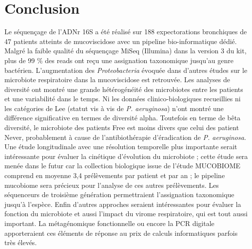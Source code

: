 \documentclass[12pt,a4paper]{article}
\begin{document}
{{\section{Conclusion}
Le séquençage de l'ADNr 16S a été réalisé sur 188 expectorations bronchiques de 47 patients atteints de mucoviscidose avec un pipeline bio-informatique dédié. Malgré la faible qualité du séquençage MiSeq (Illumina) dans la version 3 du kit, plus de 99 \% des reads ont reçu une assignation taxonomique jusqu'au genre bactérien. L'augmentation des \textit{Proteobacteria} évoquée dans d'autres études sur le microbiote respiratoire dans la mucoviscidose est retrouvée. Les analyses de diversité ont montré une grande hétérogénéité des microbiotes entre les patients et une variabilité dans le temps. Ni les données clinico-biologiques recueillies ni les catégories de Lee (statut vis à vis de \textit{P. aeruginosa}) n'ont montré une différence significative en termes de diversité alpha. Toutefois en terme de bêta diversité, le microbiote des patients Free est moins divers que celui des patient Never, probablement à cause de l'antibiothérapie d'éradication de \textit{P. aeruginosa}. 
Une étude longitudinale avec une résolution temporelle plus importante serait intéressante pour évaluer la cinétique d'évolution du microbiote ; cette étude sera menée dans le futur car la collection biologique issue de l'étude MUCOBIOME comprend en moyenne 3,4 prélèvements par patient et par an ; le pipeline mucobiome sera précieux pour l'analyse de ces autres prélèvements. Les séquenceurs de troisième génération permettraient l'assignation taxonomique jusqu'à l'espèce.
Enfin d'autres approches seraient intéressantes pour évaluer la fonction du microbiote et aussi l'impact du virome respiratoire, qui est tout aussi important. La métagénomique fonctionnelle ou encore la PCR digitale apporteraient ces éléments de réponse au prix de calculs informatiques parfois très élevés.






\clearpage


\newpage
\pagestyle{empty}

}}
\end{document}
